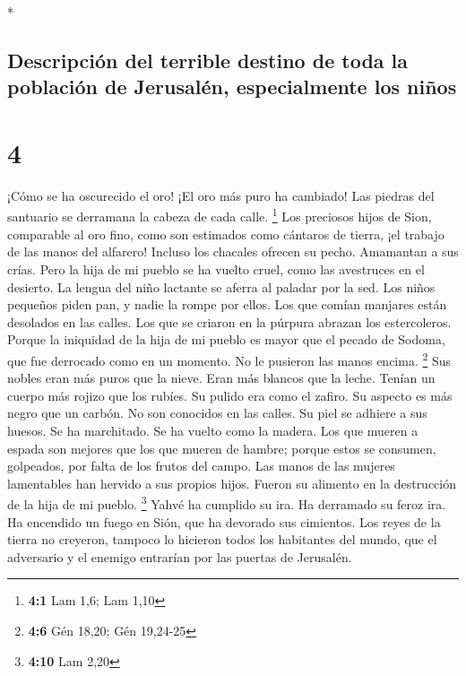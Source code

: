 \begin{paracol}{2}
\begin{otherlanguage}{english}
\end{otherlanguage}

\switchcolumn[0]*

\hypertarget{descripciuxf3n-del-terrible-destino-de-toda-la-poblaciuxf3n-de-jerusaluxe9n-especialmente-los-niuxf1os}{%
\subsection{Descripción del terrible destino de toda la población de
Jerusalén, especialmente los
niños}\label{descripciuxf3n-del-terrible-destino-de-toda-la-poblaciuxf3n-de-jerusaluxe9n-especialmente-los-niuxf1os}}

\hypertarget{section-6}{%
\section{4}\label{section-6}}

 ¡Cómo se ha oscurecido el oro! ¡El oro más puro ha
cambiado! Las piedras del santuario se derramana la cabeza de cada
calle. \footnote{\textbf{4:1} Lam 1,6; Lam 1,10}  Los
preciosos hijos de Sion, comparable al oro fino, como son estimados como
cántaros de tierra, ¡el trabajo de las manos del alfarero!
 Incluso los chacales ofrecen su pecho. Amamantan a sus
crías. Pero la hija de mi pueblo se ha vuelto cruel, como las avestruces
en el desierto.  La lengua del niño lactante se aferra al
paladar por la sed. Los niños pequeños piden pan, y nadie la rompe por
ellos.  Los que comían manjares están desolados en las
calles. Los que se criaron en la púrpura abrazan los estercoleros.
 Porque la iniquidad de la hija de mi pueblo es mayor que
el pecado de Sodoma, que fue derrocado como en un momento. No le
pusieron las manos encima. \footnote{\textbf{4:6} Gén 18,20; Gén
  19,24-25}  Sus nobles eran más puros que la nieve. Eran
más blancos que la leche. Tenían un cuerpo más rojizo que los rubíes. Su
pulido era como el zafiro.  Su aspecto es más negro que un
carbón. No son conocidos en las calles. Su piel se adhiere a sus huesos.
Se ha marchitado. Se ha vuelto como la madera.  Los que
mueren a espada son mejores que los que mueren de hambre; porque estos
se consumen, golpeados, por falta de los frutos del campo.
 Las manos de las mujeres lamentables han hervido a sus
propios hijos. Fueron su alimento en la destrucción de la hija de mi
pueblo. \footnote{\textbf{4:10} Lam 2,20}  Yahvé ha
cumplido su ira. Ha derramado su feroz ira. Ha encendido un fuego en
Sión, que ha devorado sus cimientos.  Los reyes de la
tierra no creyeron, tampoco lo hicieron todos los habitantes del mundo,
que el adversario y el enemigo entrarían por las puertas de Jerusalén.


\end{paracol}
